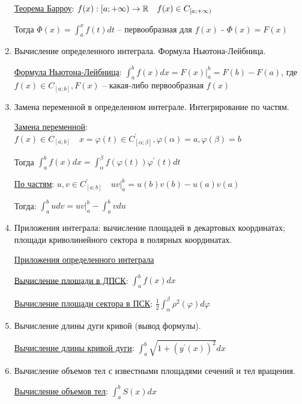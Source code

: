 \documentclass[12pt]{article}
\begin{document}
\begin{enumerate}
        \hyperlink{theorembarrow}{Теорема Барроу}: $f(x) : [a;+\infty) \to \mathbb{R} \quad f(x) \in C_{[a;+\infty)}$

        Тогда $\Phi(x) = \int^x_a f(t) dt$ -- первообразная для $f(x)$ - $\Phi(x) = F(x)$


        \item Вычисление определенного интеграла. Формула Ньютона-Лейбница.

        \hyperlink{formulanewtonleibniz}{Формула Ньютона-Лейбница}: $\int^b_a f(x)dx = F(x) \Big|^b_a = F(b) - F(a)$, где $f(x) \in C_{[a;b]}, F(x)$ -- какая-либо первообразная $f(x)$

        \item Замена переменной в определенном интеграле. Интегрирование по частям.

        \hyperlink{integralsubstitution}{Замена переменной}: $f(x) \in C_{[a;b]} \quad x = \varphi(t) \in C^\prime_{[\alpha;\beta]}, \varphi(\alpha) = a, \varphi(\beta) = b$

        Тогда $\int^b_a f(x)dx = \int^\beta_\alpha f(\varphi(t)) \varphi^\prime(t) dt$

        \hyperlink{integralbyparts}{По частям}: $u, v \in C^\prime_{[a;b]} \quad uv \Big|_a^b = u(b)v(b) - u(a)v(a)$

        Тогда: $\int^b_a udv = uv \Big|_a^b - \int^b_a vdu$


        \item Приложения интеграла: вычисление площадей в декартовых координатах; площади криволинейного сектора в полярных координатах.

        \hyperlink{integralapplications}{Приложения определенного интеграла}

        \hyperlink{integralareadpsk}{Вычисление площади в ДПСК}: $\int_a^b f(x) dx$

        \hyperlink{integralareapsk}{Вычисление площади сектора в ПСК}: $\frac{1}{2} \int_\alpha^\beta \rho^2(\varphi) d\varphi$


        \item Вычисление длины дуги кривой (вывод формулы).

        \hyperlink{lengthofarc}{Вычисление длины кривой дуги}: $\int_a^b \sqrt{1 + (y^\prime(x))^2} dx$

        \item Вычисление объемов тел с известными площадями сечений и тел вращения.

        \hyperlink{volumeofbodieswithknownarea}{Вычисление объемов тел}: $\int^b_a S(x)dx$


\end{enumerate}
\end{document}
